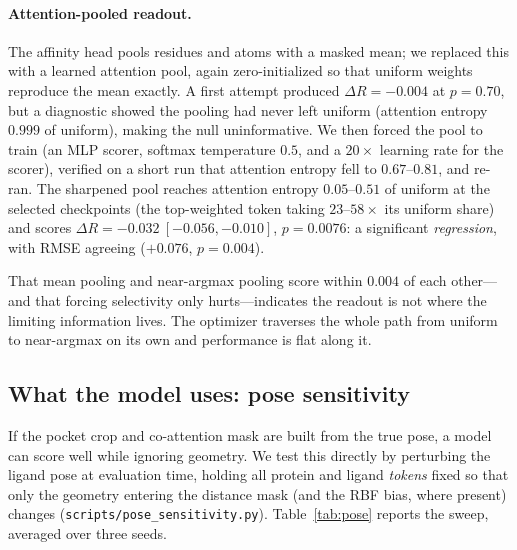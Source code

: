 \documentclass[11pt]{article}
\newcommand{\code}[1]{\texttt{#1}}
\begin{document}
\paragraph{Attention-pooled readout.} The affinity head pools residues and atoms with a
masked mean; we replaced this with a learned attention pool, again zero-initialized so that
uniform weights reproduce the mean exactly. A first attempt produced $\Delta R = -0.004$ at
$p=0.70$, but a diagnostic showed the pooling had never left uniform (attention entropy
$0.999$ of uniform), making the null uninformative. We then forced the pool to train (an
MLP scorer, softmax temperature $0.5$, and a $20\times$ learning rate for the scorer),
verified on a short run that attention entropy fell to $0.67$--$0.81$, and re-ran. The
sharpened pool reaches attention entropy $0.05$--$0.51$ of uniform at the selected
checkpoints (the top-weighted token taking $23$--$58\times$ its uniform share) and scores
$\Delta R = -0.032\ [-0.056, -0.010]$, $p=0.0076$: a significant \emph{regression}, with
RMSE agreeing ($+0.076$, $p=0.004$).

That mean pooling and near-argmax pooling score within $0.004$ of each other---and that
forcing selectivity only hurts---indicates the readout is not where the limiting information
lives. The optimizer traverses the whole path from uniform to near-argmax on its own and
performance is flat along it.

\subsection{What the model uses: pose sensitivity}
\label{sec:pose}

If the pocket crop and co-attention mask are built from the true pose, a model can score
well while ignoring geometry. We test this directly by perturbing the ligand pose at
evaluation time, holding all protein and ligand \emph{tokens} fixed so that only the
geometry entering the distance mask (and the RBF bias, where present) changes
(\code{scripts/pose\_sensitivity.py}). Table~\ref{tab:pose} reports the sweep, averaged over
three seeds.
\end{document}
